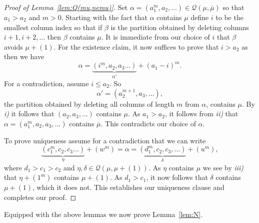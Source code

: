 \documentclass{article}
\theoremstyle{plain}
\theoremstyle{definition}
\newcommand{\Q}{\mathcal{Q}}
\renewcommand{\ne}[1]{\overline{#1}}
\begin{document}
\begin{proof}[Proof of Lemma~\ref{lem:Q(mu,nemu)}]
	Set $\alpha = (a_1^m, a_2,\ldots) \in \Q(\mu,\ne\mu)$ so that $a_1>a_2$ and $m>0$.  
Starting with the fact that $\alpha$ contains $\mu$ define $i$ to be the smallest column index so that if $\beta$ is the partition obtained by deleting columns $i+1,i+2,\ldots$ then $\beta$ contains $\mu$.  It is immediate from our choice of $i$ that $\beta$ avoids $\mu+(1)$.  For the existence claim, it now suffices to prove that $i>a_2$ as then we have 
$$\alpha = \underbrace{(i^m, a_2,a_3\ldots )}_{\alpha'} + (a_1-i)^m.$$ 
For a contradiction, assume $i\leq a_2$.  So
$$\alpha' = (a_2^{m+1}, a_3,\ldots),$$
the partition obtained by deleting all columns of length $m$ from $\alpha$, contains $\mu$.  By \emph{i)} it follows that $(a_2, a_3,\ldots)$ contains $\mu$. As $a_1>a_2$, it follows from \emph{ii)} that $\alpha = (a_1^m,a_2,a_3,\ldots)$ contains $\ne\mu$.   This contradicts our choice of $\alpha$. 

To prove uniqueness assume for a contradiction that we can write 
$$\underbrace{(c_1^m, c_2,c_3 \ldots)}_\eta  + (w^m) = \alpha = \underbrace{(d_1^m, c_2, c_3, \ldots)}_\delta + (u^m),$$
where $d_1>c_1>c_2$ and $\eta ,\delta\in \Q(\mu,\mu+(1))$.  As $\eta $ contains $\mu$ we see by \emph{iii)} that $\eta +(1^m)$ contains $\mu+(1)$.  As $d_1>c_1$, it now follows that $\delta$ contains $\mu+(1)$, which it does not. This establishes our uniqueness clause and completes our proof.
\end{proof}


Equipped with the above lemmas we now prove Lemma~\ref{lem:N}.
\end{document}

